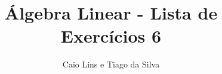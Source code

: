 \documentclass[leqno]{article}
\begin{document}
\newtheorem{teo}{Teorema} \newtheorem*{teo*}{Teorema}
\newtheorem{prop}[teo]{Proposição} \newtheorem*{prop*}{Proposição}
\newtheorem{lema}[teo]{Lemma} \newtheorem*{lema*}{Lema}
\newtheorem{cor}[teo]{Corolário} \newtheorem*{cor*}{Corolário}

\theoremstyle{definition}
\newtheorem{defi}[teo]{Definição} \newtheorem*{defi*}{Definição}
\newtheorem{exem}[teo]{Exemplo} \newtheorem*{exem*}{Exemplo}
\newtheorem{obs}[teo]{Observação} \newtheorem*{obs*}{Observação}
\newtheorem*{hipo}{Hipóteses}
\newtheorem*{nota}{Notação}

\newcommand{\ds}{\displaystyle} \newcommand{\nl}{\newline}
\newcommand{\eps}{\varepsilon} \newcommand{\ssty}{\scriptstyle}
\newcommand{\bE}{\mathbb{E}}
\newcommand{\cB}{\mathcal{B}}
\newcommand{\cF}{\mathcal{F}}
\newcommand{\cA}{\mathcal{A}}
\newcommand{\cM}{\mathcal{M}}
\newcommand{\cD}{\mathcal{D}}
\newcommand{\cN}{\mathcal{N}}
\newcommand{\cL}{\mathcal{L}}
\newcommand{\cLN}{\mathcal{LN}}
\newcommand{\bP}{\mathbb{P}}
\newcommand{\bQ}{\mathbb{Q}}
\newcommand{\bN}{\mathbb{N}}
\newcommand{\bR}{\mathbb{R}}
\newcommand{\bZ}{\mathbb{Z}}

\newcommand{\bfw}{\mathbf{w}}
\newcommand{\bfv}{\mathbf{v}}
\newcommand{\bfu}{\mathbf{u}}
\newcommand{\bfx}{\mathbf{x}}
\newcommand{\bfb}{\mathbf{b}}

\newcommand{\bvecc}[2]{%
  \begin{bmatrix} #1 \\ #2  \end{bmatrix}
}
\newcommand{\bveccc}[3]{%
  \begin{bmatrix} #1 \\ #2 \\ #3  \end{bmatrix}
}

\newenvironment{sol}
{
    \vspace{4mm}
    \noindent\textbf{Resolução:}
    \strut\newline
    \smallskip
    \hspace{-3.5mm}
}
{}

\title{Álgebra Linear - Lista de Exercícios 6}

\author{Caio Lins e Tiago da Silva}

\date{}

\maketitle
\end{document}
